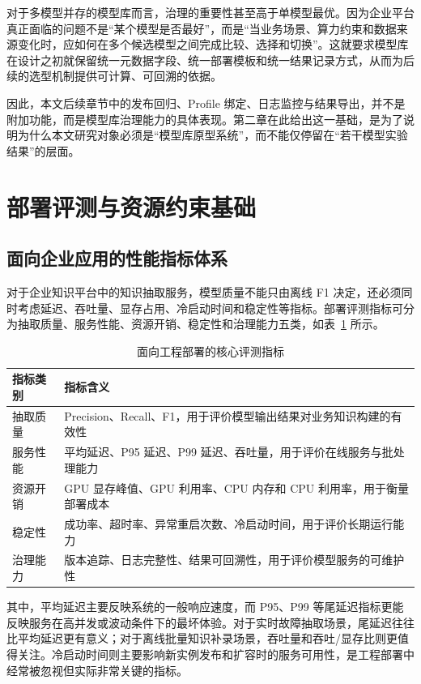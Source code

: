 对于多模型并存的模型库而言，治理的重要性甚至高于单模型最优。因为企业平台真正面临的问题不是“某个模型是否最好”，而是“当业务场景、算力约束和数据来源变化时，应如何在多个候选模型之间完成比较、选择和切换”。这就要求模型库在设计之初就保留统一元数据字段、统一部署模板和统一结果记录方式，从而为后续的选型机制提供可计算、可回溯的依据。

因此，本文后续章节中的发布回归、Profile 绑定、日志监控与结果导出，并不是附加功能，而是模型库治理能力的具体表现。第二章在此给出这一基础，是为了说明为什么本文研究对象必须是“模型库原型系统”，而不能仅停留在“若干模型实验结果”的层面。

\section{部署评测与资源约束基础}
\subsection{面向企业应用的性能指标体系}
对于企业知识平台中的知识抽取服务，模型质量不能只由离线 F1 决定，还必须同时考虑延迟、吞吐量、显存占用、冷启动时间和稳定性等指标。部署评测指标可分为抽取质量、服务性能、资源开销、稳定性和治理能力五类，如表~\ref{tab:foundation_metrics_compact} 所示。

\begin{table}[htbp]
  \centering
  \caption{面向工程部署的核心评测指标}
  \vspace{0.5em}\wuhao
  \begin{tabularx}{\textwidth}{l X}
    \toprule
    指标类别 & 指标含义 \\
    \midrule
    抽取质量 & Precision、Recall、F1，用于评价模型输出结果对业务知识构建的有效性 \\
    服务性能 & 平均延迟、P95 延迟、P99 延迟、吞吐量，用于评价在线服务与批处理能力 \\
    资源开销 & GPU 显存峰值、GPU 利用率、CPU 内存和 CPU 利用率，用于衡量部署成本 \\
    稳定性 & 成功率、超时率、异常重启次数、冷启动时间，用于评价长期运行能力 \\
    治理能力 & 版本追踪、日志完整性、结果可回溯性，用于评价模型服务的可维护性 \\
    \bottomrule
  \end{tabularx}
  \label{tab:foundation_metrics_compact}
\end{table}

其中，平均延迟主要反映系统的一般响应速度，而 P95、P99 等尾延迟指标更能反映服务在高并发或波动条件下的最坏体验。对于实时故障抽取场景，尾延迟往往比平均延迟更有意义；对于离线批量知识补录场景，吞吐量和吞吐/显存比则更值得关注。冷启动时间则主要影响新实例发布和扩容时的服务可用性，是工程部署中经常被忽视但实际非常关键的指标。

